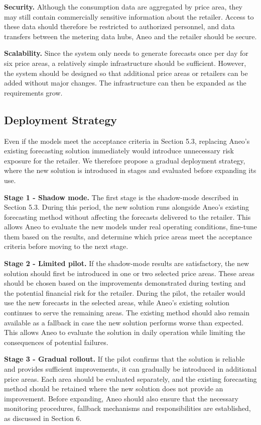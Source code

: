 \documentclass[11pt,a4paper]{article}
\begin{document}
\textbf{Security.} Although the consumption data are aggregated by price area, they may still contain commercially sensitive information about the retailer. Access to these data should therefore be restricted to authorized personnel, and data transfers between the metering data hubs, Aneo and the retailer should be secure.

\textbf{Scalability.} Since the system only needs to generate forecasts once per day for six price areas, a relatively simple infrastructure should be sufficient. However, the system should be designed so that additional price areas or retailers can be added without major changes. The infrastructure can then be expanded as the requirements grow.

\subsection{Deployment Strategy}

Even if the models meet the acceptance criteria in Section 5.3, replacing Aneo's existing forecasting solution immediately would introduce unnecessary risk exposure for the retailer. We therefore propose a gradual deployment strategy, where the new solution is introduced in stages and evaluated before expanding its use.

\textbf{Stage 1 - Shadow mode.} The first stage is the shadow-mode described in Section 5.3. During this period, the new solution runs alongside Aneo's existing forecasting method without affecting the forecasts delivered to the retailer. This allows Aneo to evaluate the new models under real operating conditions, fine-tune them based on the results, and determine which price areas meet the acceptance criteria before moving to the next stage.

\textbf{Stage 2 - Limited pilot.} If the shadow-mode results are satisfactory, the new solution should first be introduced in one or two selected price areas. These areas should be chosen based on the improvements demonstrated during testing and the potential financial risk for the retailer. During the pilot, the retailer would use the new forecasts in the selected areas, while Aneo's existing solution continues to serve the remaining areas. The existing method should also remain available as a fallback in case the new solution performs worse than expected. This allows Aneo to evaluate the solution in daily operation while limiting the consequences of potential failures.

\textbf{Stage 3 - Gradual rollout.} If the pilot confirms that the solution is reliable and provides sufficient improvements, it can gradually be introduced in additional price areas. Each area should be evaluated separately, and the existing forecasting method should be retained where the new solution does not provide an improvement. Before expanding, Aneo should also ensure that the necessary monitoring procedures, fallback mechanisms and responsibilities are established, as discussed in Section 6.
\end{document}
